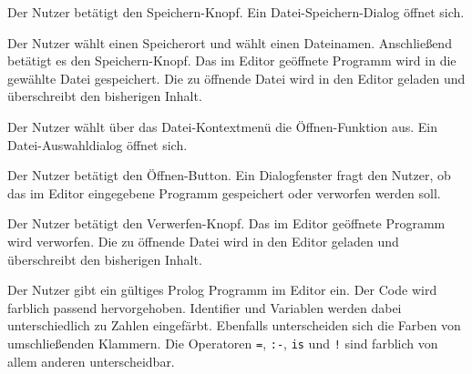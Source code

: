 \documentclass[parskip=full,11pt,twoside]{scrartcl}
\begin{document}
{Der Nutzer betätigt den Speichern-Knopf.}
{Ein Datei-Speichern-Dialog öffnet sich.}

{Der Nutzer wählt einen Speicherort und wählt einen Dateinamen. Anschließend betätigt es den Speichern-Knopf.}
{Das im Editor geöffnete Programm wird in die gewählte Datei gespeichert. Die zu öffnende Datei wird in den Editor geladen und überschreibt den bisherigen Inhalt.}



{Der Nutzer wählt über das Datei-Kontextmenü die Öffnen-Funktion aus.}
{Ein Datei-Auswahldialog öffnet sich.}

{Der Nutzer betätigt den Öffnen-Button.}
{Ein Dialogfenster fragt den Nutzer, ob das im Editor eingegebene Programm gespeichert oder verworfen werden soll.}

{Der Nutzer betätigt den Verwerfen-Knopf.}
{Das im Editor geöffnete Programm wird verworfen. Die zu öffnende Datei wird in den Editor geladen und überschreibt den bisherigen Inhalt.}



{Der Nutzer gibt ein gültiges Prolog Programm im Editor ein.}
{Der Code wird farblich passend hervorgehoben. Identifier und Variablen werden dabei unterschiedlich zu Zahlen eingefärbt. Ebenfalls unterscheiden sich die Farben von umschließenden Klammern. Die Operatoren \texttt{=}, \texttt{:-}, \texttt{is} und \texttt{!} sind farblich von allem anderen unterscheidbar.}

\end{document}
